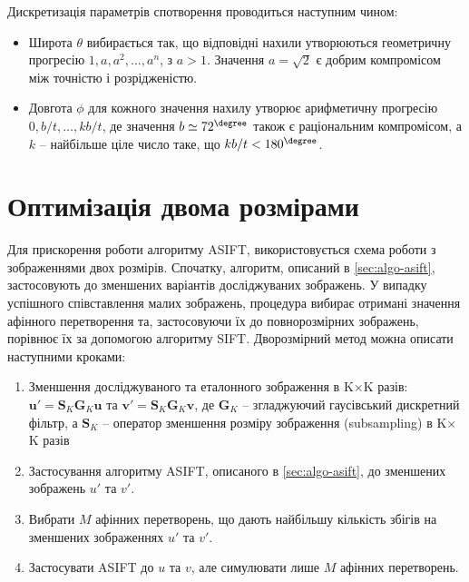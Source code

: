 
Дискретизація параметрів спотворення проводиться наступним чином:
\begin{itemize}
    \item Широта $\theta$ вибирається так, що відповідні нахили утворюються геометричну прогресію $1, a, a^2, \ldots,a^n$, з $a>1$. Значення $a = \sqrt{2}$ є добрим компромісом між точністю і розрідженістю. 
    \item Довгота $\phi$ для кожного значення нахилу утворює арифметичну прогресію $0, b/t, \ldots, kb/t$, де значення $b \simeq 72^{\degree}$ також є раціональним компромісом, а $k$ -- найбільше ціле число таке, що $kb/t < 180^{\degree}$.
\end{itemize}


\section{Оптимізація двома розмірами}

Для прискорення роботи алгоритму ASIFT, використовується схема роботи з зображеннями двох розмірів. Спочатку, алгоритм, описаний в \ref{sec:algo-asift}, застосовують до зменшених варіантів досліджуваних зображень. У випадку успішного співставлення малих зображень, процедура вибирає отримані значення афінного перетворення та, застосовуючи їх до повнорозмірних зображень, порівнює їх за допомогою алгоритму SIFT. Дворозмірний метод можна описати наступними кроками:

\begin{enumerate}
  \item Зменшення досліджуваного та еталонного зображення в K$\times$K разів: $\mathbf{u}' = \mathbf{S}_K\mathbf{G}_K\mathbf{u}$ та $\mathbf{v}' = \mathbf{S}_K\mathbf{G}_K\mathbf{v}$, де $\mathbf{G}_K$ -- згладжуючий гаусівський дискретний фільтр, а $\textbf{S}_K$ -- оператор зменшення розміру зображення (subsampling) в K$\times$K разів
  \item Застосування алгоритму ASIFT, описаного в \ref{sec:algo-asift}, до зменшених зображень $u'$ та $v'$.
  \item Вибрати $M$ афінних перетворень, що дають найбільшу кількість збігів на зменшених зображеннях $u'$ та $v'$.
  \item Застосувати ASIFT до  $u$ та $v$, але симулювати лише $M$ афінних перетворень.

\end{enumerate}
